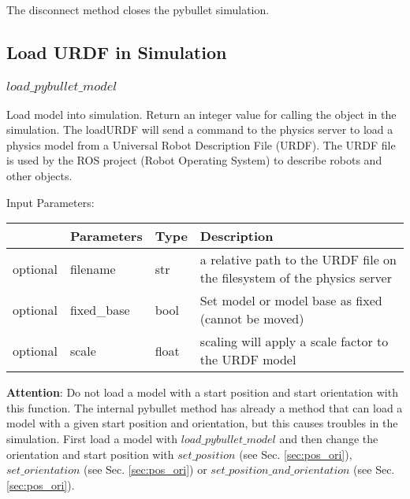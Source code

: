\documentclass[
	ngerman,
	accentcolor=9c,%
	type=intern,
	marginpar=false
	]{tudapub}
\begin{document}
\vspace{0.5cm}
\noindent The disconnect method closes the pybullet simulation. 


\vspace{0.5cm}
\subsection{Load URDF in Simulation}
\label{sec:load_urdf}
\subsubsection{$load\_pybullet\_model$}
\noindent Load model into simulation. Return an integer value for calling the object in the simulation. The loadURDF will send a command to the physics server to load a physics model from a Universal Robot Description File (URDF). The URDF file is used by the ROS project (Robot Operating System) to describe robots and other objects.


\vspace{0.5cm}
\noindent Input Parameters:
\vspace{0.5cm}

\begin{tabular}{|p{}|p{}|p{}| p{}|}
\hline
 & \textbf{Parameters} & \textbf{Type} & \textbf{Description} \\
\hline
optional & filename & str & a relative path to the URDF file on the filesystem of the physics server\\
\hline
optional & fixed\_base & bool & Set model or model base as fixed (cannot be moved)\\
\hline
optional & scale & float & scaling will apply a scale factor to the URDF model\\
\hline
\end{tabular}
\vspace{0.5cm}


\noindent \textbf{Attention}: Do not load a model with a start position and start orientation with this function. The internal pybullet method has already a method that can load a model with a given start position and orientation, but this causes troubles in the simulation. First load a model with $load\_pybullet\_model$ and then change the orientation and start position with $set\_position$ (see Sec. \ref{sec:pos_ori}),  $set\_orientation$ (see Sec. \ref{sec:pos_ori}) or $set\_position\_and\_orientation$ (see Sec. \ref{sec:pos_ori}). 
\end{document}
